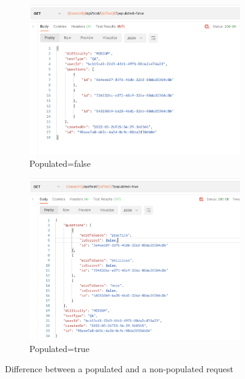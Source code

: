         \begin{figure}[H]
            \centering
            \begin{subfigure}[T]{0.49\textwidth}
                \centering
                \includegraphics[width=\textwidth]{assets/populated_false.png}
                \caption{Populated=false}
                \label{fig:impl_populated_false}
            \end{subfigure}
            \hfill
            \begin{subfigure}[T]{0.49\textwidth}
                \centering
                \includegraphics[width=\textwidth]{assets/populated_true.png}
                \caption{Populated=true}
                \label{fig:impl_populated_true}
            \end{subfigure}
               \caption{Difference between a populated and a non-populated request}
               \label{fig:impl_populated}
        \end{figure}

